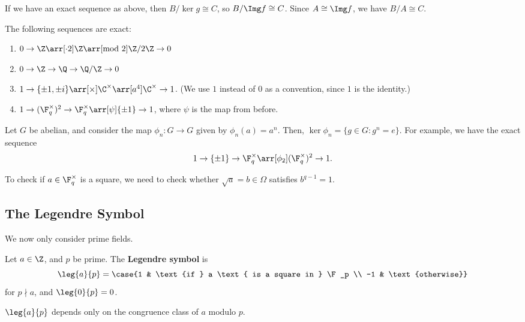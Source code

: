 \begin{prop}
    If we have an exact sequence as above, then $B/\ker g \cong C$, so $B/\Img f \cong C$. Since $A \cong \Img f$, we have $B/A \cong C$.
\end{prop}

\begin{ex}
    The following sequences are exact:
    \begin{enumerate}
        \item $0 \to \Z \arr[\cdot 2] \Z \arr[\text{mod } 2] \Z/2\Z \to 0$
        \item $0 \to \Z \to \Q \to \Q/\Z \to 0$
        \item $1 \to \{\pm 1, \pm i\} \arr[\times] \C^\times \arr[a^4] \C^\times \to 1$. (We use $1$ instead of $0$ as a convention, since $1$ is the identity.)
        \item $1 \to (\F_q^\times)^2 \to \F_q^\times \arr[\psi] \{\pm 1\} \to 1$, where $\psi$ is the map from before.
    \end{enumerate}
\end{ex}

\begin{ex}
    Let $G$ be abelian, and consider the map $\phi_n : G \to G$ given by $\phi_n(a) = a^n$. Then, $\ker \phi_n = \{g \in G : g^n = e\}$. For example, we have the exact sequence
    $$1 \to \{\pm 1\} \to \F_q^\times \arr[\phi_2] (\F_q^\times)^2 \to 1.$$
\end{ex}

\begin{notebox*}[Principle]
    To check if $a \in \F_q^\times$ is a square, we need to check whether $\sqrt{a} = b \in \Omega$ satisfies $b^{q-1} = 1$.
\end{notebox*}

\subsection{The Legendre Symbol}

We now only consider prime fields.

\begin{defn}
    Let $a \in \Z$, and $p$ be prime. The \textbf{Legendre symbol} is
    $$\leg{a}{p} = \case{1 & \text{if } a \text{ is a square in } \F_p \\ -1 & \text{otherwise}}$$
    for $p \nmid a$, and $\leg{0}{p} = 0$.
\end{defn}

\begin{notebox*}
    $\leg{a}{p}$ depends only on the congruence class of $a$ modulo $p$.
\end{notebox*}

